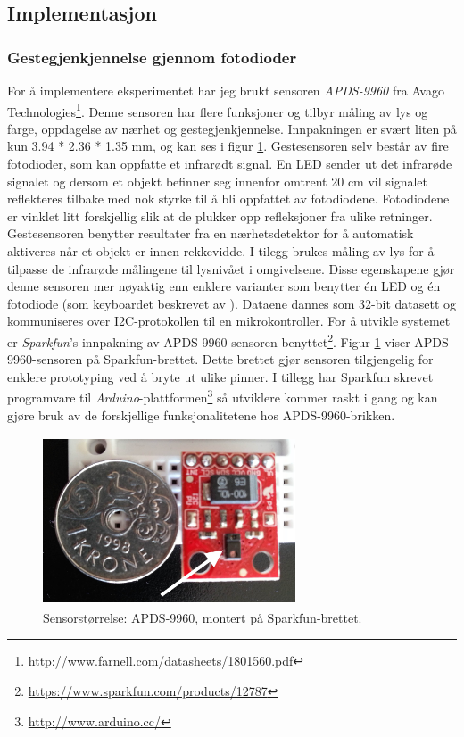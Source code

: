 \subsection{Implementasjon}

\subsubsection{Gestegjenkjennelse gjennom fotodioder}
For å implementere eksperimentet har jeg brukt sensoren \emph{APDS-9960} fra Avago Technologies\footnote{\url{http://www.farnell.com/datasheets/1801560.pdf}}. Denne sensoren har flere funksjoner og tilbyr måling av lys og farge, oppdagelse av nærhet og gestegjenkjennelse. Innpakningen er svært liten på kun 3.94 * 2.36 * 1.35 mm, og kan ses i figur \ref{fig:sensor-size}. Gestesensoren selv består av fire fotodioder, som kan oppfatte et infrarødt signal. En LED sender ut det infrarøde signalet og dersom et objekt befinner seg innenfor omtrent 20 cm vil signalet reflekteres tilbake med nok styrke til å bli oppfattet av fotodiodene. Fotodiodene er vinklet litt forskjellig slik at de plukker opp refleksjoner fra ulike retninger. Gestesensoren benytter resultater fra en nærhetsdetektor for å automatisk aktiveres når et objekt er innen rekkevidde. I tilegg brukes måling av lys for å tilpasse de infrarøde målingene til lysnivået i omgivelsene. Disse egenskapene gjør denne sensoren mer nøyaktig enn enklere varianter som benytter én LED og én fotodiode (som keyboardet beskrevet av \citet{96bytes}). Dataene dannes som 32-bit datasett og kommuniseres over I2C-protokollen til en mikrokontroller. For å utvikle systemet er \emph{Sparkfun}'s innpakning av APDS-9960-sensoren benyttet\footnote{\url{https://www.sparkfun.com/products/12787}}. Figur \ref{fig:sensor-size} viser APDS-9960-sensoren på Sparkfun-brettet. Dette brettet gjør sensoren tilgjengelig for enklere prototyping ved å bryte ut ulike pinner. I tillegg har Sparkfun skrevet programvare til \emph{Arduino}-plattformen\footnote{\url{http://www.arduino.cc/}} så utviklere kommer raskt i gang og kan gjøre bruk av de forskjellige funksjonalitetene hos APDS-9960-brikken.
\begin{figure}[h]
\centering
\includegraphics[width=7.5cm, height=5cm]{fig/sensor-size}
\caption{Sensorstørrelse: APDS-9960, montert på Sparkfun-brettet.}
\label{fig:sensor-size}
\end{figure}

